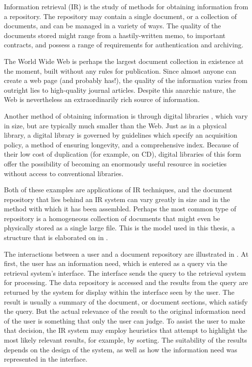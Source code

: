 Information retrieval (IR) is the study of methods for
obtaining information from a repository.  The repository
may contain a single document, or a collection of documents,
and can be managed in a variety of ways.
The quality of the documents stored might range from
a hastily-written memo, to important contracts, and possess
a range of requirements for authentication and archiving.  

The World Wide Web \citep{bernerslee96:computer}
is perhaps the largest
document collection in existence at the moment, built
without any rules for publication.  Since almost anyone can create a
web page (and probably has!), the quality of the information 
varies from outright lies
to high-quality journal articles.  Despite this anarchic nature, the
Web is nevertheless an extraordinarily rich source of 
information.

Another method of obtaining information is through digital 
libraries \citep{wb02:book}, which vary in size, but are typically much 
smaller than the Web.  Just as in a physical library, a digital
library is governed by guidelines which specify an acquisition
policy,
a method of ensuring longevity, and a comprehensive
index.  Because of their low cost of duplication (for example,
on CD), digital libraries of this form offer the possibility of
becoming an enormously useful resource in societies without access
to conventional libraries.

Both of these examples are applications of IR techniques, and
the document
repository that lies behind an IR system can vary greatly in size and 
in the method with which it has been assembled.  
Perhaps the most common type of repository is a 
homogeneous collection of documents that 
might even be physically stored as a
single large file.  This is the model used in this 
thesis, a structure that is elaborated on in .

The interactions between a user and a document repository
are illustrated in .
At first, the user has an information need, which is entered as a
query via the retrieval system's interface.  The interface 
sends the query to the retrieval system for processing.
The data repository is accessed and
the results from the query are returned by the system for
display within the interface seen by the user.  The result is usually
a summary of the document, or document sections, which 
satisfy the query.  But the actual relevance of
the result to the original information need of the user is 
something that only the user can judge.  To assist the user to
make that decision, the IR system may
employ heuristics that attempt to highlight the most likely
relevant results, for example, by sorting.
The suitability of the results depends on the design of
the system, as well as how the information need was represented
in the interface.  

